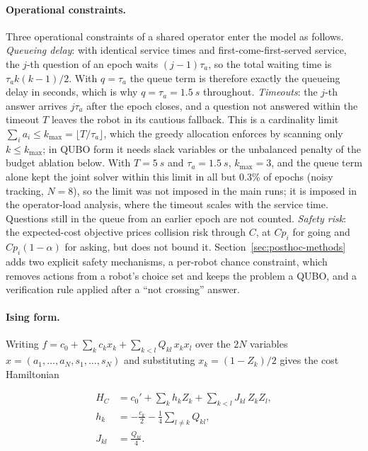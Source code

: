 \documentclass[a4paper,fleqn]{cas-dc}
\begin{document}
\paragraph{Operational constraints.} Three operational constraints of a shared operator enter the model as follows. \emph{Queueing delay}: with identical service times and first-come-first-served service, the $j$-th question of an epoch waits $(j-1)\tau_a$, so the total waiting time is $\tau_a k(k-1)/2$. With $q = \tau_a$ the queue term is therefore exactly the queueing delay in seconds, which is why $q = \tau_a = \SI{1.5}{s}$ throughout. \emph{Timeouts}: the $j$-th answer arrives $j\tau_a$ after the epoch closes, and a question not answered within the timeout $T$ leaves the robot in its cautious fallback. This is a cardinality limit $\sum_i a_i \le k_{\max} = \lfloor T/\tau_a \rfloor$, which the greedy allocation enforces by scanning only $k \le k_{\max}$; in QUBO form it needs slack variables or the unbalanced penalty of the budget ablation below. With $T = \SI{5}{s}$ and $\tau_a = \SI{1.5}{s}$, $k_{\max} = 3$, and the queue term alone kept the joint solver within this limit in all but 0.3\% of epochs (noisy tracking, $N = 8$), so the limit was not imposed in the main runs; it is imposed in the operator-load analysis, where the timeout scales with the service time. Questions still in the queue from an earlier epoch are not counted. \emph{Safety risk}: the expected-cost objective prices collision risk through $C$, at $Cp_i$ for going and $Cp_i(1-\alpha)$ for asking, but does not bound it. Section~\ref{sec:posthoc-methods} adds two explicit safety mechanisms, a per-robot chance constraint, which removes actions from a robot's choice set and keeps the problem a QUBO, and a verification rule applied after a ``not crossing'' answer.

\paragraph{Ising form.} Writing $f = c_0 + \sum_k c_k x_k + \sum_{k<l} Q_{kl}\, x_k x_l$ over the $2N$ variables $x = (a_1,\dots,a_N,s_1,\dots,s_N)$ and substituting $x_k = (1 - Z_k)/2$ gives the cost Hamiltonian

\begin{equation}
\begin{aligned}
H_C &= c_0' + \sum_{k} h_k Z_k + \sum_{k<l} J_{kl}\, Z_k Z_l, \\
h_k &= -\frac{c_k}{2} - \frac{1}{4}\sum_{l \ne k} Q_{kl}, \\
J_{kl} &= \frac{Q_{kl}}{4}.
\end{aligned}
\label{eq:ising}
\end{equation}
\end{document}
